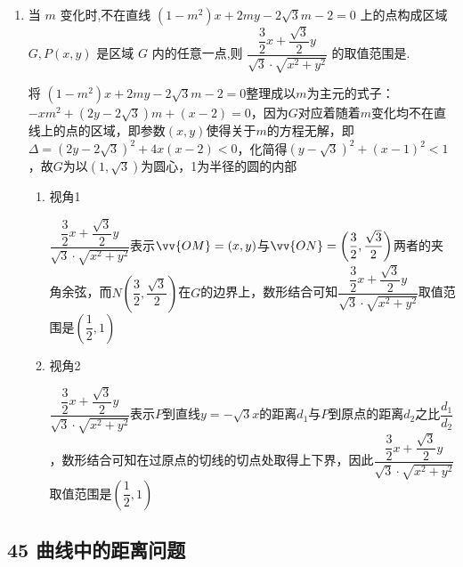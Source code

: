 \begin{enumerate}
\begin{jieda}
        
        $\because O,M,N$ 共线, $\therefore \dfrac{y}{x} = \dfrac{{y}^{\prime }}{{x}^{\prime }},\therefore {k}_{1} + {k}_{2} =  - \left( {{k}_{3} + {k}_{4}}\right)$ .
    \end{jieda}

    \item 当 $m$ 变化时,不在直线 $\left( {1 - {m}^{2}}\right) x + {2my} - 2\sqrt{3}m - 2 = 0$ 上的点构成区域 $G,P\left( {x,y}\right)$ 是区域 $G$ 内的任意一点,则 $\dfrac{\dfrac{3}{2}x + \dfrac{\sqrt{3}}{2}y}{\sqrt{3} \cdot  \sqrt{{x}^{2} + {y}^{2}}}$ 的取值范围是.
    \begin{jieda}
        将 $\left( {1 - {m}^{2}}\right) x + {2my} - 2\sqrt{3}m - 2 = 0$整理成以$m$为主元的式子：$-xm^2+(2y-2\sqrt{3})m+(x-2) = 0$，因为$G$对应着随着$m$变化均不在直线上的点的区域，即参数$(x, y)$使得关于$m$的方程无解，即$\Delta = (2y-2\sqrt{3})^2 + 4x(x-2) < 0$，化简得$(y-\sqrt{3})^2+(x-1)^2 < 1$，故$G$为以$(1, \sqrt{3})$为圆心，1为半径的圆的内部

        \begin{enumerate}
            \item 视角1 
            
            $\dfrac{\dfrac{3}{2}x + \dfrac{\sqrt{3}}{2}y}{\sqrt{3} \cdot  \sqrt{{x}^{2} + {y}^{2}}}$表示$\vv{OM} = (x, y)$与$\vv{ON} = \left(\dfrac{3}{2}, \dfrac{\sqrt{3}}{2}\right)$两者的夹角余弦，而$N\left(\dfrac{3}{2}, \dfrac{\sqrt{3}}{2}\right)$在$G$的边界上，数形结合可知$\dfrac{\dfrac{3}{2}x + \dfrac{\sqrt{3}}{2}y}{\sqrt{3} \cdot  \sqrt{{x}^{2} + {y}^{2}}}$取值范围是$\left(\dfrac{1}{2}, 1\right)$
            
            \item 视角2

            $\dfrac{\dfrac{3}{2}x + \dfrac{\sqrt{3}}{2}y}{\sqrt{3} \cdot  \sqrt{{x}^{2} + {y}^{2}}}$表示$P$到直线$y = -\sqrt{3}x$的距离$d_1$与$P$到原点的距离$d_2$之比$\dfrac{d_1}{d_2}$，数形结合可知在过原点的切线的切点处取得上下界，因此$\dfrac{\dfrac{3}{2}x + \dfrac{\sqrt{3}}{2}y}{\sqrt{3} \cdot  \sqrt{{x}^{2} + {y}^{2}}}$取值范围是$\left(\dfrac{1}{2}, 1\right)$
        \end{enumerate}
    \end{jieda}
\end{enumerate}

\subsection*{45 曲线中的距离问题}

